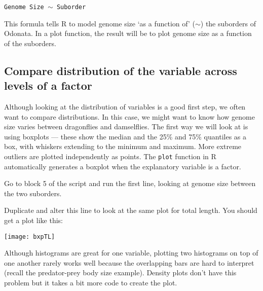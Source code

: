 	{\tt Genome Size $\sim$ Suborder}

This formula tells R to model genome size `as a function of' 
($\sim$) the suborders of Odonata. In a plot function, the 
result will be to plot genome size as a function of the suborders.
 
\subsection{Compare distribution of the variable across levels of a 
factor}

Although looking at the distribution of variables is a good first step, 
we often want to compare distributions. In this case, we might want to 
know how genome size varies between dragonflies and damselflies. The 
first way we will look at is using boxplots --- these show the median 
and the 25\% and 75\% quantiles as a box, with whiskers extending to 
the minimum and maximum. More extreme outliers are plotted 
independently as points. The {\tt plot} function in R automatically 
generates a boxplot when the explanatory variable is a factor.

\begin{compactitem}[$\quad\star$]
\item Go to block 5 of the script and run the first line, looking at 
genome size between the two suborders.
\item Duplicate and alter this line to look at the same plot for total 
length. You should get a plot like this:
\end{compactitem}
 
\begin{center}
    \texttt{[image: bxpTL]} 
\end{center}
 
Although histograms are great for one variable, plotting two histograms 
on top of one another rarely works well because the overlapping bars 
are hard to interpret (recall the predator-prey body size example). 
Density plots don't have this problem but it takes a bit more code to 
create the plot. 

